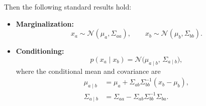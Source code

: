 \documentclass[../main]{subfiles}
\begin{document}
Then the following standard results hold:

\begin{itemize}
    \item \textbf{Marginalization:}
    \begin{equation}
        x_a \sim \mathcal N(\mu_a,\Sigma_{aa}),
        \qquad
        x_b \sim \mathcal N(\mu_b,\Sigma_{bb}).
    \end{equation}

    \item \textbf{Conditioning:}
    \begin{equation}
        p(x_a \mid x_b)
        =
        \mathcal N\!\bigl(
            \mu_{a\mid b},\,
            \Sigma_{a\mid b}
        \bigr),
    \end{equation}
    where the conditional mean and covariance are
    \begin{equation}
    \begin{aligned}
        \mu_{a\mid b}
        &= \mu_a + \Sigma_{ab}\Sigma_{bb}^{-1}(x_b - \mu_b),\\[4pt]
        \Sigma_{a\mid b}
        &= \Sigma_{aa} - \Sigma_{ab}\Sigma_{bb}^{-1}\Sigma_{ba}.
    \end{aligned}
    \end{equation}
\end{itemize}
\end{document}
